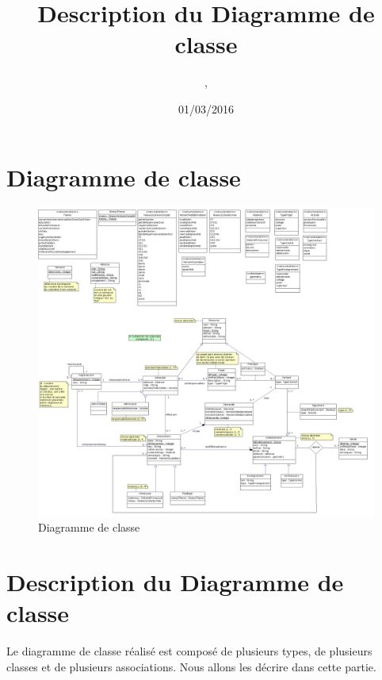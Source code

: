 \documentclass[asi, sansVersion]{picInsa}
\begin{document}
\title{Description du Diagramme de classe}
\author{\Mathieu, \Julie}
\date{01/03/2016} 

\maketitle

\tableofcontents

\chapter{Diagramme de classe}

\begin{landscape}
\begin{figure}
	\centering
	\includegraphics[scale=0.3]{images/diagrammeDeClasses}
	\caption{\label{modele}Diagramme de classe}
\end{figure}
\end{landscape}

\chapter{Description du Diagramme de classe}

Le diagramme de classe réalisé est composé de plusieurs types, de plusieurs classes et de plusieurs associations. Nous allons les décrire dans cette partie. \\ 
\end{document}
